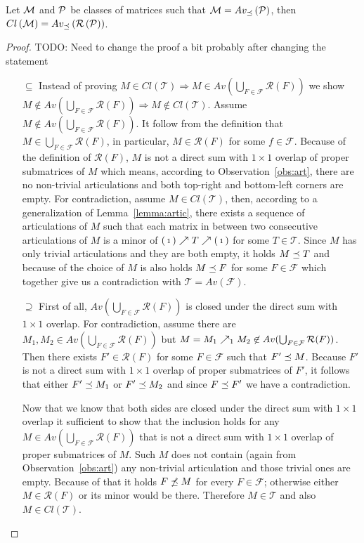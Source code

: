 \begin{thm}
\label{thm:basis}
Let $\mathcal{M}$ and $\mathcal{P}$ be classes of matrices such that $\mathcal{M}=Av_{\preceq}\left(\mathcal{P}\right)$, then $Cl\left(\mathcal{M}\right)=Av_{\preceq}\left(\mathcal{R}\left(\mathcal{P}\right)\right)$.
\end{thm}
\begin{proof}
TODO: Need to change the proof a bit probably after changing the statement
\begin{itemize}
	\item[$\subseteq$] Instead of proving $M\in Cl(\mathcal{T})\Rightarrow M\in Av(\bigcup_{F\in\mathcal{F}}\mathcal{R}(F))$ we show $M\not\in Av(\bigcup_{F\in\mathcal{F}}\mathcal{R}(F))\Rightarrow M\not\in Cl(\mathcal{T})$. Assume $M\not\in Av(\bigcup_{F\in\mathcal{F}}\mathcal{R}(F))$. It follow from the definition that $M\in\bigcup_{F\in\mathcal{F}}\mathcal{R}(F)$, in particular, $M\in\mathcal{R}(F)$ for some $f\in\mathcal{F}$. Because of the definition of $\mathcal{R}(F)$, $M$ is not a direct sum with $1\times1$ overlap of proper submatrices of $M$ which means, according to Observation~\ref{obs:art}, there are no non-trivial articulations and both top-right and bottom-left corners are empty. For contradiction, assume $M\in Cl(\mathcal{T})$, then, according to a generalization of Lemma~\ref{lemma:artic}, there exists a sequence of articulations of $M$ such that each matrix in between two consecutive articulations of $M$ is a minor of $\left(\begin{smallmatrix}1\end{smallmatrix}\right)\nearrow T\nearrow\left(\begin{smallmatrix}1\end{smallmatrix}\right)$ for some $T\in\mathcal{T}$. Since $M$ has only trivial articulations and they are both empty, it holds $M\preceq T$ and because of the choice of $M$ is also holds $M\preceq F$ for some $F\in\mathcal{F}$ which together give us a contradiction with $\mathcal{T}=Av(\mathcal{F})$.
	\item[$\supseteq$] First of all, $Av(\bigcup_{F\in\mathcal{F}}\mathcal{R}(F))$ is closed under the direct sum with $1\times1$ overlap. For contradiction, assume there are $M_1,M_2\in Av(\bigcup_{F\in\mathcal{F}}\mathcal{R}(F))$ but $M=M_1\nearrow_{1}M_2\not\in Av(\bigcup_{F\in\mathcal{F}}\mathcal{R}(F))$. Then there exists $F'\in\mathcal{R}(F)$ for some $F\in\mathcal{F}$ such that $F'\preceq M$. Because $F'$ is not a direct sum with $1\times1$ overlap of proper submatrices of $F'$, it follows that either $F'\preceq M_1$ or $F'\preceq M_2$ and since $F\preceq F'$ we have a contradiction.

Now that we know that both sides are closed under the direct sum with $1\times1$ overlap it sufficient to show that the inclusion holds for any $M\in Av(\bigcup_{F\in\mathcal{F}}\mathcal{R}(F))$ that is not a direct sum with $1\times1$ overlap of proper submatrices of $M$. Such $M$ does not contain (again from Observation~\ref{obs:art}) any non-trivial articulation and those trivial ones are empty. Because of that it holds $F\not\preceq M$ for every $F\in\mathcal{F}$; otherwise either $M\in\mathcal{R}(F)$ or its minor would be there. Therefore $M\in\mathcal{T}$ and also $M\in Cl(\mathcal{T})$.
\end{itemize}
\end{proof}

